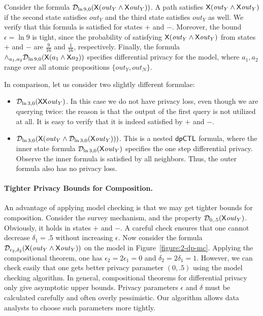 Consider the formula $\mathcal{D}_{{\ln 9}, {0}} (\mathsf{X} (\mathit{out}_Y\wedge \mathsf{X} \mathit{out}_Y))$. A path satisfies $\mathsf{X} (\mathit{out}_Y\wedge \mathsf{X} \mathit{out}_Y)$ if the second state satisfies $\mathit{out}_Y$ and the third state satisfies $\mathit{out}_Y$ as well. We verify that this formula is satisfied for states $+$ and $-$. Moreover, the bound $\epsilon=\ln 9$ is tight, since the probability of satisfying $\mathsf{X} (\mathit{out}_Y\wedge \mathsf{X} \mathit{out}_Y)$ from states $+$ and $-$ are $\frac{9}{16}$ and $\frac{1}{16}$, respectively. Finally, the formula $\wedge_{a_1,a_2}\mathcal{D}_{{\ln 9}, {0}} (\mathsf{X} (a_1\wedge \mathsf{X} a_2))$ specifies differential privacy for the model, where $a_1,a_2$ range over all atomic propositions $\{\mathit{out}_Y, \mathit{out}_N\}$.

In comparison, let us consider two slightly different formulae:
\begin{itemize}
\item $\mathcal{D}_{{\ln 3}, {0}} (\mathsf{X} \mathsf{X} \mathit{out}_Y)$. In this case we do not have privacy loss, even though we are querying twice: the reason is that the output of the first query is not utilized at all. It is easy to verify that it is indeed satisfied by $+$ and $-$.
\item $\mathcal{D}_{{\ln 3}, {0}} (\mathsf{X} (\mathit{out}_Y\wedge \mathcal{D}_{{\ln 3}, {0}}(\mathsf{X} \mathit{out}_Y)))$. This is a nested $\textsf{dpCTL}$ formula, where the inner state formula $\mathcal{D}_{{\ln 3}, {0}}(\mathsf{X} \mathit{out}_Y)$ specifies the one step differential privacy. Observe the inner formula is satisfied by all neighbors. Thus, the outer formula also has no privacy loss.
\end{itemize}

\paragraph{Tighter Privacy Bounds for Composition.}
An advantage of applying model checking is that we may get tighter bounds for composition. Consider the survey mechanism, and the property $\mathcal{D}_{{0}, {.5}} (\mathsf{X} \mathit{out}_Y)$. Obviously, it holds in states $+$ and $-$. A careful check ensures that one cannot decrease  $\delta_1=.5$ without increasing $\epsilon$.
Now consider the formula $\mathcal{D}_{{\epsilon_2}, {\delta_2}} (\mathsf{X}
(\mathit{out}_Y\wedge \mathsf{X} \mathit{out}_Y))$ on the model in
Figure~\ref{figure:2-dp-mc}. Applying the
compositional theorem, one has $\epsilon_2=2\epsilon_1=0$ and
$\delta_2=2\delta_1=1$. However, we can check easily that one gets
better privacy parameter $(0,.5)$ using the model checking algorithm.
In general, compositional theorems for differential privacy only give
asymptotic upper bounds. Privacy parameters $\epsilon$ and $\delta$
must be calculated carefully and often overly pessimistic. Our
algorithm allows data analysts to choose such parameters more
tightly.


